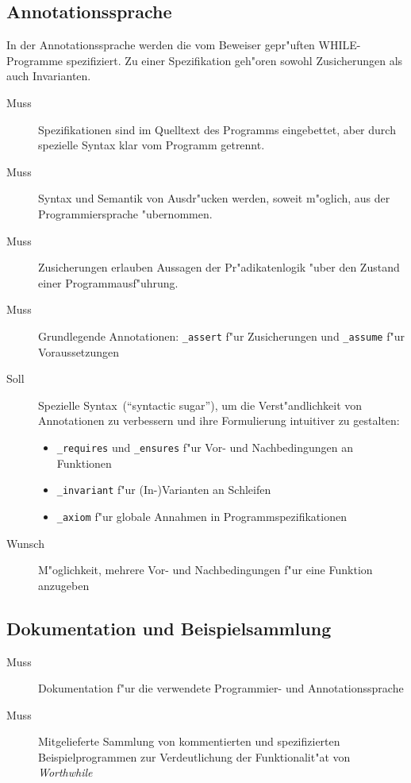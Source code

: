 \subsection{Annotationssprache}%

In der \see Annotationssprache werden die vom Beweiser gepr"uften WHILE-Programme spezifiziert. Zu einer Spezifikation geh"oren sowohl Zusicherungen als auch Invarianten.%

\begin{description}%
    \item [Muss] Spezifikationen sind im Quelltext des Programms eingebettet, aber durch spezielle Syntax klar vom Programm getrennt.%
    \item [Muss] Syntax und Semantik von Ausdr"ucken werden, soweit m"oglich, aus der Programmiersprache "ubernommen.%
    \item [Muss] Zusicherungen erlauben Aussagen der \see Pr"adikatenlogik "uber den Zustand einer Programmausf"uhrung.%
    \item [Muss] Grundlegende Annotationen: \texttt{\_assert} f"ur Zusicherungen und \texttt{\_assume} f"ur Voraussetzungen%
    \item [Soll] Spezielle Syntax~("`syntactic sugar"'), um die Verst"andlichkeit von Annotationen zu verbessern und ihre Formulierung intuitiver zu gestalten:%
        \begin{itemize}%
            \item \texttt{\_requires} und \texttt{\_ensures} f"ur \see Vor- und Nachbedingungen an Funktionen%
            \item \texttt{\_invariant} f"ur \see (In-)Varianten an Schleifen%
            \item \texttt{\_axiom} f"ur \see globale Annahmen in Programmspezifikationen%
        \end{itemize}%
    \item [Wunsch] M"oglichkeit, mehrere Vor- und Nachbedingungen f"ur eine Funktion anzugeben%
\end{description}%

\subsection{Dokumentation und Beispielsammlung}%

\begin{description}%
    \item [Muss] Dokumentation f"ur die verwendete Programmier- und Annotationssprache%
    \item [Muss] Mitgelieferte Sammlung von kommentierten und spezifizierten Beispielprogrammen zur Verdeutlichung der Funktionalit"at von \textit{Worthwhile}%
\end{description}%
